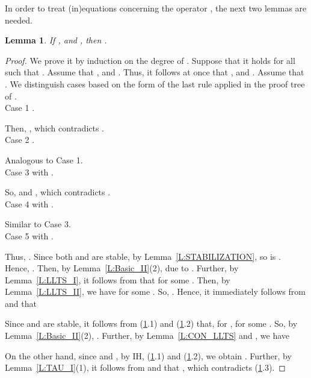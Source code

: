 \documentclass{elsarticle}
\theoremstyle{plain}
\newtheorem{lemma}[theorem]{Lemma}
\theoremstyle{definition}
\begin{document}
In order to treat (in)equations concerning the operator , the next two lemmas are needed.

\begin{lemma}\label{L:RS_CON}
If ,  and , then .
\end{lemma}
\begin{proof}
    We prove it by induction on the degree of .
    Suppose that it holds for all  such that .
    Assume that ,  and .
    Thus, it follows at once that ,  and .
    Assume that .
    We distinguish cases based on the form of the last rule applied in the proof tree of .\\

\noindent Case 1 .

            Then, , which contradicts .\\

\noindent Case 2 .

            Analogous to Case 1.\\

\noindent Case 3  with .

            So,  and , which contradicts .\\

\noindent Case 4   with .

          Similar to Case 3.\\

\noindent Case 5  with .

        Thus, .
        Since both  and  are stable, by Lemma~\ref{L:STABILIZATION}, so is .
        Hence, .
        Then, by Lemma~\ref{L:Basic_II}(2),  due to .
        Further, by Lemma~\ref{L:LLTS_I}, it follows from  that  for some .
        Then, by Lemma~\ref{L:LLTS_II}, we have  for some .
        So, .
        Hence, it immediately follows from    and  that
        
        
        Since  and  are stable, it follows from (\ref{L:RS_CON}.1) and (\ref{L:RS_CON}.2) that, for ,  for some .
        So, by Lemma~\ref{L:Basic_II}(2), .
        Further, by Lemma~\ref{L:CON_LLTS} and , we have
        
        On the other hand, since  and , by IH, (\ref{L:RS_CON}.1) and (\ref{L:RS_CON}.2), we obtain .
        Further,  by Lemma~\ref{L:TAU_I}(1), it follows from   and   that , which contradicts (\ref{L:RS_CON}.3).
\end{proof}
\end{document}
